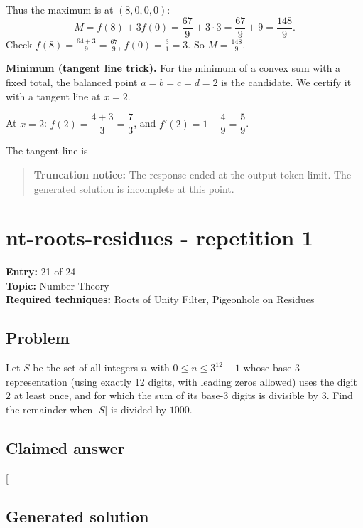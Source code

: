\documentclass[
  11pt,
  letterpaper,
]{article}
\begin{document}
Thus the maximum is at \((8,0,0,0)\): \[
M=f(8)+3f(0)=\frac{67}{9}+3\cdot 3=\frac{67}{9}+9=\frac{148}{9}.
\] Check \(f(8)=\frac{64+3}{9}=\frac{67}{9}\), \(f(0)=\frac{3}{1}=3\).
So \(M=\frac{148}{9}\).

\textbf{Minimum (tangent line trick).} For the minimum of a convex sum
with a fixed total, the balanced point \(a=b=c=d=2\) is the candidate.
We certify it with a tangent line at \(x=2\).

At \(x=2\): \(f(2)=\dfrac{4+3}{3}=\dfrac{7}{3}\), and
\(f'(2)=1-\dfrac{4}{9}=\dfrac{5}{9}\).

The tangent line is

\begin{quote}
\textbf{Truncation notice:} The response ended at the output-token
limit. The generated solution is incomplete at this point.
\end{quote}

\clearpage

\section{nt-roots-residues - repetition
1}\label{nt-roots-residues---repetition-1}

\textbf{Entry:} 21 of 24\\
\textbf{Topic:} Number Theory\\
\textbf{Required techniques:} Roots of Unity Filter, Pigeonhole on
Residues

\subsection{Problem}\label{problem-20}

Let \(S\) be the set of all integers \(n\) with \(0 \le n \le 3^{12}-1\)
whose base-3 representation (using exactly 12 digits, with leading zeros
allowed) uses the digit \(2\) at least once, and for which the sum of
its base-3 digits is divisible by \(3\). Find the remainder when \(|S|\)
is divided by \(1000\).

\subsection{Claimed answer}\label{claimed-answer-20}

{[}\boxed{908}{]}

\subsection{Generated solution}\label{generated-solution-20}
\end{document}
